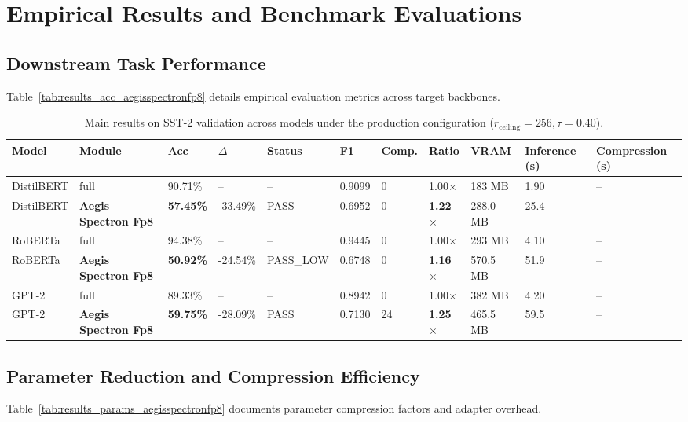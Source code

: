 \section{Empirical Results and Benchmark Evaluations}

\subsection{Downstream Task Performance}
Table~\ref{tab:results_acc_aegisspectronfp8} details empirical evaluation metrics across target backbones.

\begin{table}[t]
\centering
\small
\begin{tabular}{lllllllllll}
\toprule
\textbf{Model} & \textbf{Module} & \textbf{Acc} & \textbf{$\Delta$} & \textbf{Status} & \textbf{F1} & \textbf{Comp.} & \textbf{Ratio} & \textbf{VRAM} & \textbf{Inference (s)} & \textbf{Compression (s)} \\
\midrule
DistilBERT & full & 90.71\% & -- & -- & 0.9099 & 0 & 1.00$\times$ & 183 MB & 1.90 & -- \\
DistilBERT & \textbf{Aegis Spectron Fp8} & \textbf{57.45\%} & -33.49\% & PASS & 0.6952 & 0 & \textbf{1.22$\times$} & 288.0 MB & 25.4 & -- \\
RoBERTa & full & 94.38\% & -- & -- & 0.9445 & 0 & 1.00$\times$ & 293 MB & 4.10 & -- \\
RoBERTa & \textbf{Aegis Spectron Fp8} & \textbf{50.92\%} & -24.54\% & PASS\_LOW & 0.6748 & 0 & \textbf{1.16$\times$} & 570.5 MB & 51.9 & -- \\
GPT-2 & full & 89.33\% & -- & -- & 0.8942 & 0 & 1.00$\times$ & 382 MB & 4.20 & -- \\
GPT-2 & \textbf{Aegis Spectron Fp8} & \textbf{59.75\%} & -28.09\% & PASS & 0.7130 & 24 & \textbf{1.25$\times$} & 465.5 MB & 59.5 & -- \\
\bottomrule
\end{tabular}
\caption{Main results on SST-2 validation across models under the production configuration ($r_{\mathrm{ceiling}}=256, \tau=0.40$).}
\label{tab:main_sst2}
\end{table}

\subsection{Parameter Reduction and Compression Efficiency}
Table~\ref{tab:results_params_aegisspectronfp8} documents parameter compression factors and adapter overhead.

